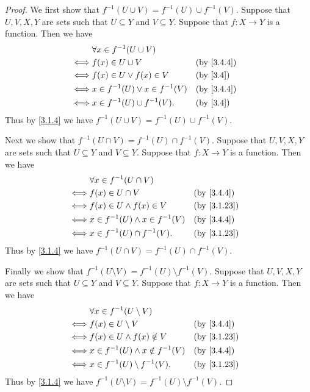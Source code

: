 \begin{proof}
	We first show that \(f^{-1}(U \cup V) = f^{-1}(U) \cup f^{-1}(V)\).
	Suppose that \(U, V, X, Y\) are sets such that \(U \subseteq Y\) and \(V \subseteq Y\).
	Suppose that \(f : X \to Y\) is a function.
	Then we have
	\begin{align*}
		     & \forall x \in f^{-1}(U \cup V)                       \\
		\iff & f(x) \in U \cup V                    &  & \by{3.4.4} \\
		\iff & f(x) \in U \lor f(x) \in V           &  & \by{3.4}   \\
		\iff & x \in f^{-1}(U) \lor x \in f^{-1}(V) &  & \by{3.4.4} \\
		\iff & x \in f^{-1}(U) \cup f^{-1}(V).      &  & \by{3.4}
	\end{align*}
	Thus by \cref{3.1.4} we have \(f^{-1}(U \cup V) = f^{-1}(U) \cup f^{-1}(V)\).

	Next we show that \(f^{-1}(U \cap V) = f^{-1}(U) \cap f^{-1}(V)\).
	Suppose that \(U, V, X, Y\) are sets such that \(U \subseteq Y\) and \(V \subseteq Y\).
	Suppose that \(f : X \to Y\) is a function.
	Then we have
	\begin{align*}
		     & \forall x \in f^{-1}(U \cap V)                         \\
		\iff & f(x) \in U \cap V                     &  & \by{3.4.4}  \\
		\iff & f(x) \in U \land f(x) \in V           &  & \by{3.1.23} \\
		\iff & x \in f^{-1}(U) \land x \in f^{-1}(V) &  & \by{3.4.4}  \\
		\iff & x \in f^{-1}(U) \cap f^{-1}(V).       &  & \by{3.1.23}
	\end{align*}
	Thus by \cref{3.1.4} we have \(f^{-1}(U \cap V) = f^{-1}(U) \cap f^{-1}(V)\).

	Finally we show that \(f^{-1}(U \setminus V) = f^{-1}(U) \setminus f^{-1}(V)\).
	Suppose that \(U, V, X, Y\) are sets such that \(U \subseteq Y\) and \(V \subseteq Y\).
	Suppose that \(f : X \to Y\) is a function.
	Then we have
	\begin{align*}
		     & \forall x \in f^{-1}(U \setminus V)                       \\
		\iff & f(x) \in U \setminus V                   &  & \by{3.4.4}  \\
		\iff & f(x) \in U \land f(x) \notin V           &  & \by{3.1.23} \\
		\iff & x \in f^{-1}(U) \land x \notin f^{-1}(V) &  & \by{3.4.4}  \\
		\iff & x \in f^{-1}(U) \setminus f^{-1}(V).     &  & \by{3.1.23}
	\end{align*}
	Thus by \cref{3.1.4} we have \(f^{-1}(U \setminus V) = f^{-1}(U) \setminus f^{-1}(V)\).
\end{proof}

